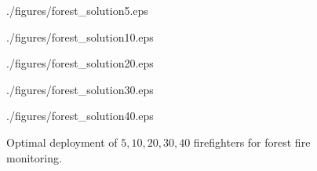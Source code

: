 \begin{figure}[ht!]
    \vspace*{-2mm}
	\begin{center}
		\begin{overpic}[width={\ifoc 4in \else 2.4in \fi},tics=5]{./figures/forest_solution5.eps}
		\end{overpic}
    \end{center}
	\begin{center}
		\begin{overpic}[width={\ifoc 4in \else 2.4in \fi},tics=5]{./figures/forest_solution10.eps}
		\end{overpic}
    \end{center}
	\begin{center}
		\begin{overpic}[width={\ifoc 4in \else 2.4in \fi},tics=5]{./figures/forest_solution20.eps}
		\end{overpic}
    \end{center}
	\begin{center}
		\begin{overpic}[width={\ifoc 4in \else 2.4in \fi},tics=5]{./figures/forest_solution30.eps}
		\end{overpic}
    \end{center}
	\begin{center}
		\begin{overpic}[width={\ifoc 4in \else 2.4in \fi},tics=5]{./figures/forest_solution40.eps}
		\end{overpic}
	\end{center}
	\vspace*{-2mm}
	\caption{\label{fig:more-forest}  Optimal deployment of $5, 10, 20, 30, 40$ firefighters for 
	forest fire monitoring.}
	\vspace*{-3mm}
\end{figure}

